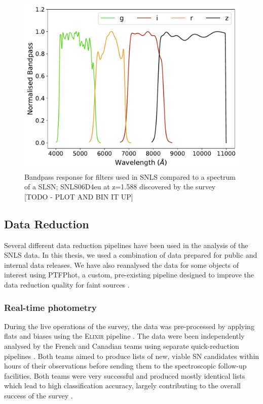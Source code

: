 \begin{figure}
  \centering
  \includegraphics[width=\textwidth]{Figures/Chapter2/SNLS_filters.pdf}
    \caption{Bandpass response for filters used in SNLS compared to a spectrum of a SLSN; SNLS06D4eu at z=1.588 discovered by the survey [TODO - PLOT AND BIN IT UP]}
    \label{fig:SNLSFilters}
\end{figure}

\subsection{Data Reduction}
Several different data reduction pipelines have been used in the analysis of the SNLS data. In this thesis, we used a combination of data prepared for public and internal data releases. We have also reanalysed the data for some objects of interest using PTFPhot, a custom, pre-existing pipeline designed to improve the data reduction quality for faint sources \citep{Firth2015}.

\subsubsection{Real-time photometry}
During the live operations of the survey, the data was pre-processed by applying flats and biases using the \textsc{Elixir} pipeline \citep{Magnier2004}. The data were been independently analysed by the French and Canadian teams using separate quick-reduction pipelines \citep{Astier2006,Bazin2011}. Both teams aimed to produce lists of new, viable SN candidates within hours of their observations before sending them to the spectroscopic follow-up facilities. Both teams were very successful and produced mostly identical lists which lead to high classification accuracy, largely contributing to the overall success of the survey \citep{Pritchet2004}.


